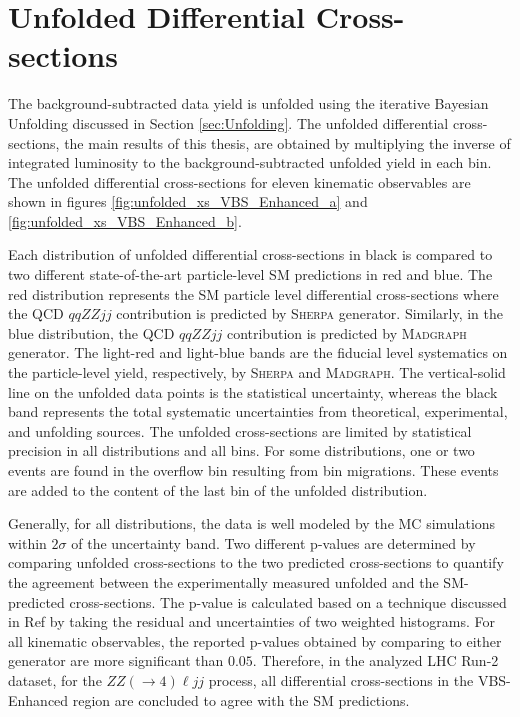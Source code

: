 \section{ Unfolded Differential Cross-sections }
\label{sec:DifferentialxS}

The background-subtracted data yield is unfolded using the iterative Bayesian Unfolding discussed in Section \ref{sec:Unfolding}. The unfolded differential cross-sections, the main results of this thesis, are obtained by multiplying the inverse of integrated luminosity to the background-subtracted unfolded yield in each bin. The unfolded differential cross-sections for eleven kinematic observables are shown in figures \ref{fig:unfolded_xs_VBS_Enhanced_a} and \ref{fig:unfolded_xs_VBS_Enhanced_b}. 

Each distribution of unfolded differential cross-sections in black is compared to two different state-of-the-art particle-level SM predictions in red and blue. The red distribution represents the SM particle level differential cross-sections where the QCD $qqZZjj$ contribution is predicted by \textsc{Sherpa} generator.
Similarly, in the blue distribution, the QCD $qqZZjj$ contribution is predicted by \textsc{Madgraph} generator. The light-red and light-blue bands are the fiducial level systematics on the particle-level yield, respectively, by \textsc{Sherpa} and \textsc{Madgraph}. The vertical-solid line on the unfolded data points is the statistical uncertainty, whereas the black band represents the total systematic uncertainties from theoretical, experimental, and unfolding sources. The unfolded cross-sections are limited by statistical precision in all distributions and all bins. For some distributions, one or two events are found in the overflow bin resulting from bin migrations. These events are added to the content of the last bin of the unfolded distribution. 

Generally, for all distributions, the data is well modeled by the MC simulations within $2\sigma$ of the uncertainty band. Two different p-values are determined by comparing unfolded cross-sections to the two predicted cross-sections to quantify the agreement between the experimentally measured unfolded and the SM-predicted cross-sections. The p-value is calculated based on a technique discussed in Ref\cite{pValueStat} by taking the residual and uncertainties of two weighted histograms. For all kinematic observables, the reported p-values obtained by comparing to either generator are more significant than $0.05$. Therefore, in the analyzed LHC Run-2 dataset, for the $ZZ (\rightarrow 4) \ell jj$ process, all differential cross-sections in the VBS-Enhanced region are concluded to agree with the SM predictions. 

